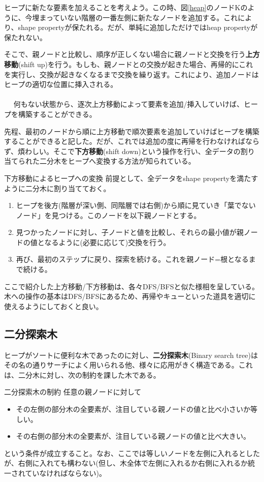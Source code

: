ヒープに新たな要素を加えることを考えよう。この時、図\ref{heap}のノードKのように、今埋まっていない階層の一番左側に新たなノードを追加する。これにより、shape propertyが保たれる。だが、単純に追加しただけではheap propertyが保たれない。

そこで、親ノードと比較し、順序が正しくない場合に親ノードと交換を行う\textbf{上方移動}(shift up)を行う。もしも、親ノードとの交換が起きた場合、再帰的にこれを実行し、交換が起きなくなるまで交換を繰り返す。これにより、追加ノードはヒープの適切な位置に挿入される。
\\ \\　
何もない状態から、逐次上方移動によって要素を追加/挿入していけば、ヒープを構築することができる。

先程、最初のノードから順に上方移動で順次要素を追加していけばヒープを構築することができると記した。だが、これでは追加の度に再帰を行わなければならず、煩わしい。そこで\textbf{下方移動}(shift down)という操作を行い、全データの割り当てられた二分木をヒープへ変換する方法が知られている。
\begin{itembox}[l]{下方移動によるヒープへの変換}
前提として、全データをshape propertyを満たすように二分木に割り当てておく。
\begin{enumerate}
\item ヒープを後方(階層が深い側、同階層では右側)から順に見ていき「葉でないノード」を見つける。このノードを以下親ノードとする。
\item 見つかったノードに対し、子ノードと値を比較し、それらの最小値が親ノードの値となるように(必要に応じて)交換を行う。
\item 再び、最初のステップに戻り、探索を続ける。これを親ノード=根となるまで続ける。
\end{enumerate}
\end{itembox}

ここで紹介した上方移動/下方移動は、各々DFS/BFSと似た様相を呈している。木への操作の基本はDFS/BFSにあるため、再帰やキューといった道具を適切に使えるようにしておくと良い。

\subsection{二分探索木}
ヒープがソートに便利な木であったのに対し、\textbf{二分探索木}(Binary search tree)はその名の通りサーチによく用いられる他、様々に応用がきく構造である。これは、二分木に対し、次の制約を課した木である。
\begin{itembox}[l]{二分探索木の制約}
任意の親ノードに対して
\begin{itemize}
\item その左側の部分木の全要素が、注目している親ノードの値と比べ小さいか等しい。
\item その右側の部分木の全要素が、注目している親ノードの値と比べ大きい。
\end{itemize}
という条件が成立すること。なお、ここでは等しいノードを左側に入れるとしたが、右側に入れても構わない(但し、木全体で左側に入れるか右側に入れるか統一されていなければならない)。
\end{itembox}

